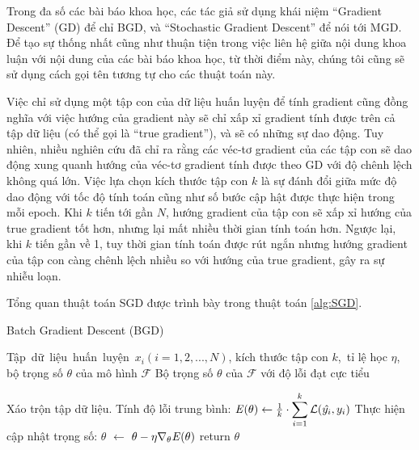 Trong đa số các bài báo khoa học, các tác giả sử dụng khái niệm ``Gradient Descent'' (GD) để chỉ BGD, và ``Stochastic Gradient Descent'' để nói tới MGD. Để tạo sự thống nhất cũng như thuận tiện trong việc liên hệ giữa nội dung khoa luận với nội dung của các bài báo khoa học, từ thời điểm này, chúng tôi cũng sẽ sử dụng cách gọi tên tương tự cho các thuật toán này.

Việc chỉ sử dụng một tập con của dữ liệu huấn luyện để tính gradient cũng đồng nghĩa với việc hướng của gradient này sẽ chỉ xấp xỉ gradient tính được trên cả tập dữ liệu (có thể gọi là ``true gradient''), và sẽ có những sự dao động. Tuy nhiên, nhiều nghiên cứu đã chỉ ra rằng các véc-tơ gradient của các tập con sẽ dao động xung quanh hướng của véc-tơ gradient tính được theo GD với độ chênh lệch không quá lớn\cite{bottou2010large}\cite{bottou2018optimization}. Việc lựa chọn kích thước tập con $k$ là sự đánh đổi giữa mức độ dao động với tốc độ tính toán cũng như số bước cập hật được thực hiện trong mỗi epoch. Khi $k$ tiến tới gần $N$, hướng gradient của tập con sẽ xấp xỉ hướng của true gradient tốt hơn, nhưng lại mất nhiều thời gian tính toán hơn. Ngược lại, khi $k$ tiến gần về 1, tuy thời gian tính toán được rút ngắn nhưng hướng gradient của tập con càng chênh lệch nhiều so với hướng của true gradient, gây ra sự nhiễu loạn.

Tổng quan thuật toán SGD được trình bày trong thuật toán \ref{alg:SGD}.

\begin{algorithm}
	\caption{Batch Gradient Descent (BGD)} \label{alg:SGD}
	\begin{algorithmic}[1]
		\renewcommand{\algorithmicrequire}{\textbf{Đầu vào:}}
		\renewcommand{\algorithmicensure}{\textbf{Đầu ra:}}
		\algnewcommand{}
		\algnewcommand\Operation{\item[\algorithmicoperation]}

		\Require Tập dữ liệu huấn luyện $x_i (i = 1, 2, ..., N)$, kích thước tập con $k$, tỉ lệ học $\eta$, bộ trọng số $\theta$ của mô hình $\mathcal{F}$
		\Ensure Bộ trọng số $\theta$ của $\mathcal{F}$ với độ lỗi đạt cực tiểu

		\Operation
			\State Xáo trộn tập dữ liệu.
				\State Tính độ lỗi trung bình: $\mathbf{\it{E}(\theta)} \gets \frac{1}{k}\cdot \displaystyle\sum_{i=1}^{k}\mathcal{L}(\hat{y_i}, y_i)$
				\State Thực hiện cập nhật trọng số: $\theta$ $\gets$ $\theta - \eta \nabla_{\theta} \mathbf{\it{E}(\theta)}$
			\EndFor
		\EndWhile
		\State return $\theta$
	\end{algorithmic}
\end{algorithm}

